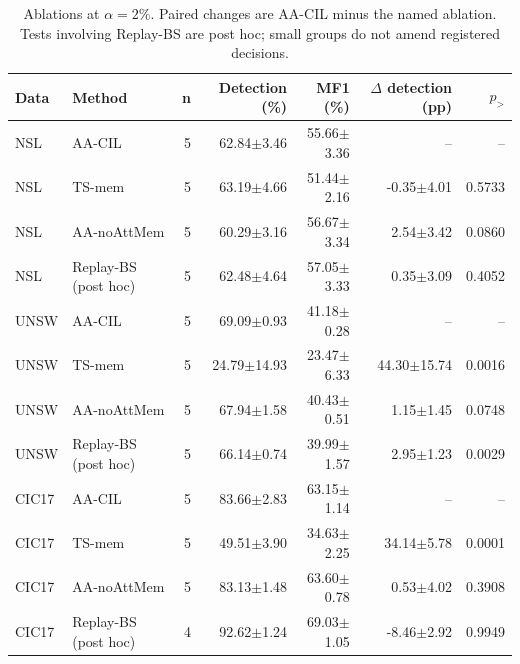 \begin{table}[t]
\centering\scriptsize
\setlength{\tabcolsep}{3.8pt}
\caption{Ablations at $\alpha=2\%$. Paired changes are AA-CIL minus the named ablation. Tests involving Replay-BS are post hoc; small groups do not amend registered decisions.}\label{tab:ablation-results}
\begin{tabular}{llrrrrr}
\toprule
Data & Method & n & Detection (\%) & MF1 (\%) & $\Delta$ detection (pp) & $p_{>}$ \\
\midrule
NSL & AA-CIL & 5 & 62.84$\pm$3.46 & 55.66$\pm$3.36 & -- & -- \\
NSL & TS-mem & 5 & 63.19$\pm$4.66 & 51.44$\pm$2.16 & -0.35$\pm$4.01 & 0.5733 \\
NSL & AA-noAttMem & 5 & 60.29$\pm$3.16 & 56.67$\pm$3.34 & 2.54$\pm$3.42 & 0.0860 \\
NSL & Replay-BS (post hoc) & 5 & 62.48$\pm$4.64 & 57.05$\pm$3.33 & 0.35$\pm$3.09 & 0.4052 \\
UNSW & AA-CIL & 5 & 69.09$\pm$0.93 & 41.18$\pm$0.28 & -- & -- \\
UNSW & TS-mem & 5 & 24.79$\pm$14.93 & 23.47$\pm$6.33 & 44.30$\pm$15.74 & 0.0016 \\
UNSW & AA-noAttMem & 5 & 67.94$\pm$1.58 & 40.43$\pm$0.51 & 1.15$\pm$1.45 & 0.0748 \\
UNSW & Replay-BS (post hoc) & 5 & 66.14$\pm$0.74 & 39.99$\pm$1.57 & 2.95$\pm$1.23 & 0.0029 \\
CIC17 & AA-CIL & 5 & 83.66$\pm$2.83 & 63.15$\pm$1.14 & -- & -- \\
CIC17 & TS-mem & 5 & 49.51$\pm$3.90 & 34.63$\pm$2.25 & 34.14$\pm$5.78 & 0.0001 \\
CIC17 & AA-noAttMem & 5 & 83.13$\pm$1.48 & 63.60$\pm$0.78 & 0.53$\pm$4.02 & 0.3908 \\
CIC17 & Replay-BS (post hoc) & 4 & 92.62$\pm$1.24 & 69.03$\pm$1.05 & -8.46$\pm$2.92 & 0.9949 \\
\bottomrule
\end{tabular}
\end{table}
